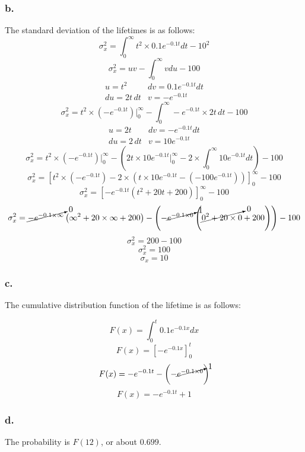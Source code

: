 \documentclass[11pt]{article}
\begin{document}
\subsubsection*{b.}
The standard deviation of the lifetimes is as follows:
\[ \sigma^2_x = \int_0^{\infty}{t^2 \times 0.1e^{-0.1t}}dt - 10^2 \]
\[ \sigma^2_x = uv - \int_{0}^{\infty} v du - 100 \]
\[
    \begin{array}{ll}
        u = t^2 & dv = 0.1e^{-0.1t} dt \\
        du = 2t\, dt & v = -e^{-0.1t}
    \end{array} 
\]
\[ \sigma^2_x = t^2\times \left( -e^{-0.1t} \right) \bigg\vert^\infty_0 -
                \int_{0}^{\infty} -e^{-0.1t} \times 2t \, dt - 100 \]
\[
    \begin{array}{ll}
        u = 2t & dv = -e^{-0.1t} dt \\
        du = 2\, dt & v = 10e^{-0.1t}
    \end{array} 
\]
\[ \sigma^2_x = t^2\times \left( -e^{-0.1t} \right) \bigg\vert^\infty_0 -
                \left( 
                    2t \times 10e^{-0.1t} \bigg\vert^\infty_0 - 
                    2 \times \int_{0}^{\infty} 10e^{-0.1t} dt
                \right) - 100\]
\[ \sigma^2_x = 
        {\left[ 
            t^2\times \left( -e^{-0.1t} \right)  -
            2 \times \left( 
                t \times 10e^{-0.1t} - 
                \left( -
                    100e^{-0.1t}
                \right)
            \right)
        \right]}^\infty_0 - 100\]
\[ \sigma^2_x = 
        {\left[ -e^{-0.1t} \left( 
            t^2  + 20t + 200
        \right)\right]}^\infty_0 - 100 \]
\[ \sigma^2_x = 
    \cancelto{0}{-e^{-0.1\times \infty}} \left( 
            \infty^2  + 20\times \infty + 200
        \right) - 
        \left(-\cancelto{1}{e^{-0.1\times 0}} \left( 
        \cancelto{0}{0^2  + 20\times 0} + 200
        \right) \right)
    - 100 \]
\[ \sigma^2_x = 200 - 100 \]
\[ \sigma^2_x = 100 \]
\[ \sigma_x = 10 \]

\subsubsection*{c.}
The cumulative distribution function of the lifetime is as follows:

\[ F(x) = \int_{0}^{t}0.1e^{-0.1x}dx \]
\[ F(x) = {\left[ -e^{-0.1x} \right]}^t_0 \]
\[ F(x) = -e^{-0.1t} - \left( -\cancelto{1}{e^{-0.1\times 0}} \right) \]
\[ F(x) = -e^{-0.1t} + 1 \]

\subsubsection*{d.}
The probability is $F(12)$, or about $0.699$. 
\end{document}
